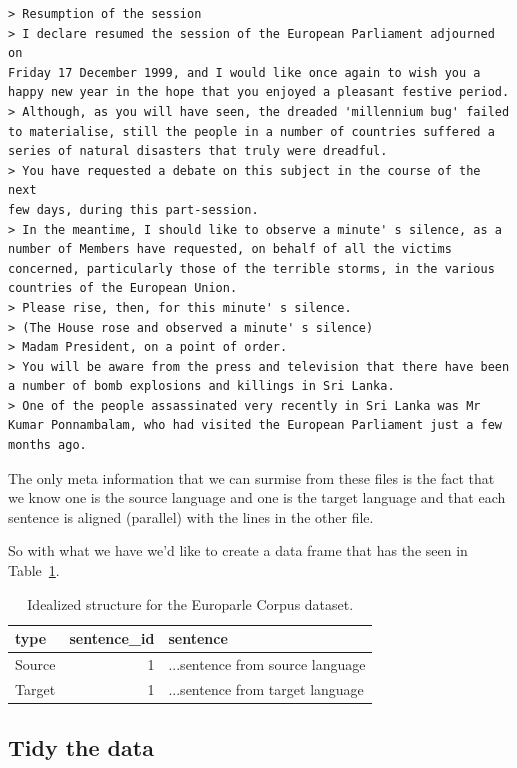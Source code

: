 \documentclass[
  letterpaper,
]{latex/krantz}
\begin{document}
\begin{verbatim}
> Resumption of the session
> I declare resumed the session of the European Parliament adjourned on
Friday 17 December 1999, and I would like once again to wish you a
happy new year in the hope that you enjoyed a pleasant festive period.
> Although, as you will have seen, the dreaded 'millennium bug' failed
to materialise, still the people in a number of countries suffered a
series of natural disasters that truly were dreadful.
> You have requested a debate on this subject in the course of the next
few days, during this part-session.
> In the meantime, I should like to observe a minute' s silence, as a
number of Members have requested, on behalf of all the victims
concerned, particularly those of the terrible storms, in the various
countries of the European Union.
> Please rise, then, for this minute' s silence.
> (The House rose and observed a minute' s silence)
> Madam President, on a point of order.
> You will be aware from the press and television that there have been
a number of bomb explosions and killings in Sri Lanka.
> One of the people assassinated very recently in Sri Lanka was Mr
Kumar Ponnambalam, who had visited the European Parliament just a few
months ago.
\end{verbatim}

The only meta information that we can surmise from these files is the
fact that we know one is the source language and one is the target
language and that each sentence is aligned (parallel) with the lines in
the other file.

So with what we have we'd like to create a data frame that has the seen
in Table~\ref{tbl-cd-unstructured-europarle-structure-example}.

\hypertarget{tbl-cd-unstructured-europarle-structure-example}{}
\begin{table}
\caption{\label{tbl-cd-unstructured-europarle-structure-example}Idealized structure for the Europarle Corpus dataset. }\tabularnewline

\centering
\begin{tabular}{lrl}
\toprule
type & sentence\_id & sentence\\
\midrule
Source & 1 & ...sentence from source language\\
Target & 1 & ...sentence from target language\\
\bottomrule
\end{tabular}
\end{table}

\hypertarget{tidy-the-data}{%
\subsection{Tidy the data}\label{tidy-the-data}}
\end{document}
